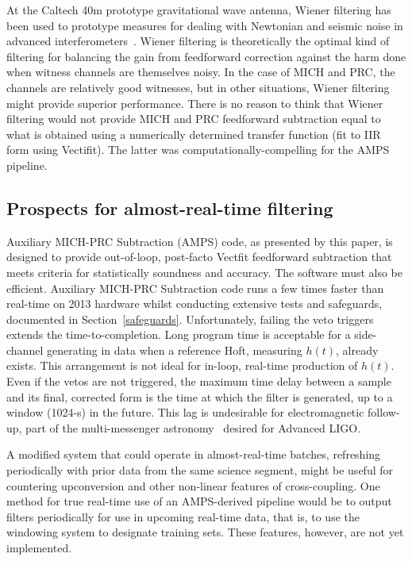 At the Caltech 40m prototype gravitational wave antenna, Wiener filtering has been used to prototype measures for dealing with Newtonian and seismic noise in advanced interferometers~\cite{Driggers2012ActiveNoise}. Wiener filtering is theoretically the optimal kind of filtering for balancing the gain from feedforward correction against the harm done when witness channels are themselves noisy. In the case of MICH and PRC, the channels are relatively good witnesses, but in other situations, Wiener filtering might provide superior performance. There is no reason to think that Wiener filtering would not provide MICH and PRC feedforward subtraction equal to what is obtained using a numerically determined transfer function (fit to IIR form using Vectifit). The latter was computationally-compelling for the AMPS pipeline. 


        \subsection{Prospects for almost-real-time filtering}
        \label{real-time}
      
            Auxiliary MICH-PRC Subtraction (AMPS) code, as presented by this paper, is designed to provide out-of-loop, post-facto Vectfit feedforward subtraction that meets criteria for statistically soundness and accuracy. The software must also be efficient. Auxiliary MICH-PRC Subtraction code runs a few times faster than real-time on 2013 hardware whilst conducting extensive tests and safeguards, documented in Section~\ref{safeguards}. Unfortunately, failing the veto triggers extends the time-to-completion. Long program time is acceptable for a side-channel generating in data when a reference Hoft, measuring $h(t)$, already exists. This arrangement is not ideal for in-loop, real-time production of $h(t)$. Even if the vetos are not triggered, the maximum time delay between a sample and its final, corrected form is the time at which the filter is generated, up to a window (1024-s) in the future. This lag is undesirable for electromagnetic follow-up, part of the multi-messenger astronomy~\cite{Swift2012,Antares2013} desired for Advanced LIGO. 

A modified system that could operate in almost-real-time batches, refreshing periodically with prior data from the same science segment, might be useful for countering upconversion and other non-linear features of cross-coupling. One method for true real-time use of an AMPS-derived pipeline would be to output filters periodically for use in upcoming real-time data, that is, to use the windowing system to designate training sets. These features, however, are not yet implemented.

